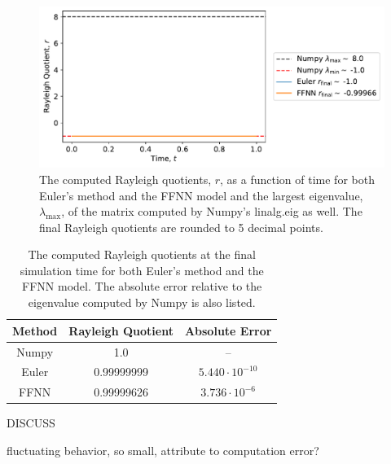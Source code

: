 \begin{figure}[H]
\begin{center}\includegraphics[scale=0.5]{latex/figures/eigval_benchrun4.pdf}
\end{center}
\caption{The computed Rayleigh quotients, $r$, as a function of time for both Euler's method and the FFNN model and the largest eigenvalue, $\lambda_\mathrm{max}$, of the matrix computed by Numpy's linalg.eig as well. The final Rayleigh quotients are rounded to 5 decimal points.}
\label{fig:benchrun4}
\end{figure}

\begin{table}[H]
\caption{The computed Rayleigh quotients at the final simulation time for both Euler's method and the FFNN model. The absolute error relative to the eigenvalue computed by Numpy is also listed.}
\centering
{}
\begin{tabular}{c|c|c}
\hline
\hline 
Method & Rayleigh Quotient & Absolute Error
\\
\hline 
\hline 
Numpy & 1.0 & –
\\
Euler & 0.99999999 & $5.440 \cdot 10^{-10}$  
\\
FFNN & 0.99999626 & $3.736 \cdot 10^{-6}$
\\
\hline
\hline 
\end{tabular}
\label{tab:eigbench4}
\end{table}

DISCUSS

fluctuating behavior, so small, attribute to computation error?













